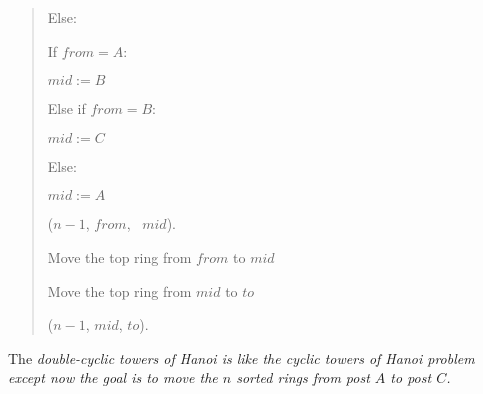 \documentclass[10pt]{article}
\begin{document}
\begin{solution}
\begin{quote}
\begin{steps}
      \item Else: 
        \begin{steps}
        \item If \(from = A\):
          \begin{steps}
          \item \(mid := B\)
          \end{steps}
        \item Else if \(from = B\):
          \begin{steps}
          \item \(mid := C\)
          \end{steps}
        \item Else:
          \begin{steps}
          \item \(mid := A\)
          \end{steps}

        \item {}(\( n - 1 \), \( from \), \ \( mid \)).

        \item Move the top ring from \( from \) to \( mid \)

        \item Move the top ring from \( mid \) to \( to \)

        \item {}(\( n - 1 \), \( mid \), \( to \)).
        \end{steps}
  \end{steps}
\end{quote}
\end{solution}
\pagebreak

The \it{double-cyclic towers of Hanoi} is like the cyclic towers of Hanoi problem except now the goal is to move the \( n \) sorted rings from post \( A \) to post \( C \).
\end{document}
